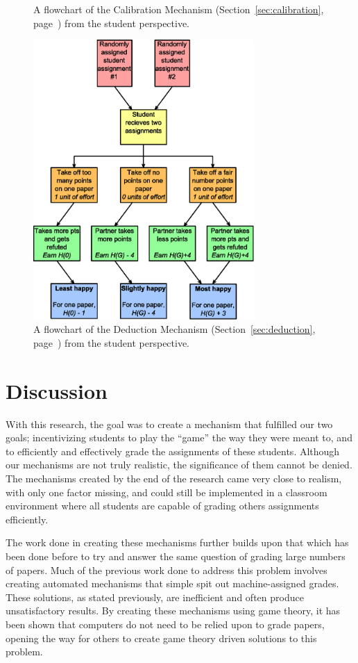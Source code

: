 \documentclass[12pt, Arial]{article}
\begin{document}
{\begin{figure}
		\caption {A flowchart of the Calibration Mechanism (Section~\ref{sec:calibration}, page~\pageref{sec:calibration}) from the student perspective.\label{fig:calibration}}
\end{figure}
\begin{figure}
	\centering
		\includegraphics[width=0.75\textwidth]{Flowchart-Deduction.eps}
		\caption {A flowchart of the Deduction Mechanism (Section~\ref{sec:deduction}, page~\pageref{sec:deduction}) from the student perspective.\label{fig:deduction}}
\end{figure}
}
\section{Discussion}
With this research, the goal was to create a mechanism that fulfilled our two goals; incentivizing students to play the ``game'' the way they were meant to, and to efficiently and effectively grade the assignments of these students. Although our mechanisms are not truly realistic, the significance of them cannot be denied. The mechanisms created by the end of the research came very close to realism, with only one factor missing, and could still be implemented in a classroom environment where all students are capable of grading others assignments efficiently.

The work done in creating these mechanisms further builds upon that which has been done before to try and answer the same question of grading large numbers of papers. Much of the previous work done to address this problem involves creating automated mechanisms that simple spit out machine-assigned grades. These solutions, as stated previously, are inefficient and often produce unsatisfactory results. By creating these mechanisms using game theory, it has been shown that computers do not need to be relied upon to grade papers, opening the way for others to create game theory driven solutions to this problem.
\end{document}
